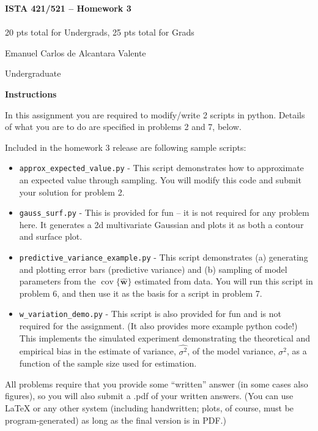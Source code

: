 \documentclass[10pt]{article}
\newcommand{\latex}{\LaTeX\xspace}
\DeclareMathOperator{\cov}{cov}
\begin{document}
\begin{center}
    {\Large {\bf ISTA 421/521 -- Homework 3}} \\
     \\
    20 pts total for Undergrads, 25 pts total for Grads
\end{center}

\begin{flushright}
Emanuel Carlos de Alcantara Valente%

Undergraduate %
\end{flushright}

\vspace{1cm}
{\Large {\bf Instructions}}

In this assignment you are required to modify/write 2 scripts in python.  Details of what you are to do are specified in problems 2 and 7, below.

Included in the homework 3 release are following sample scripts:
\begin{itemize}
\item {\tt approx\_expected\_value.py} - This script demonstrates how to approximate an expected value through sampling.  You will modify this code and submit your solution for problem 2.
\item {\tt gauss\_surf.py} - This is provided for fun -- it is not required for any problem here.  It generates a 2d multivariate Gaussian and plots it as both a contour and surface plot.
\item {\tt predictive\_variance\_example.py} - This script demonstrates (a) generating and plotting error bars (predictive variance) and (b) sampling of model parameters from the $\cov\{\widehat{\mathbf{w}}\}$ estimated from data.  You will run this script in problem 6, and then use it as the basis for a script in problem 7.
\item {\tt w\_variation\_demo.py} - This script is also provided for fun and is not required for the assignment. (It also provides more example python code!)  This implements the simulated experiment demonstrating the theoretical and empirical bias in the estimate of variance, $\widehat{\sigma^2}$, of the model variance, $\sigma^2$, as a function of the sample size used for estimation.
\end{itemize}

All problems require that you provide some ``written'' answer (in some cases also figures), so you will also submit a .pdf of your written answers.  (You can use \latex or any other system (including handwritten; plots, of course, must be program-generated) as long as the final version is in PDF.)
\end{document}
